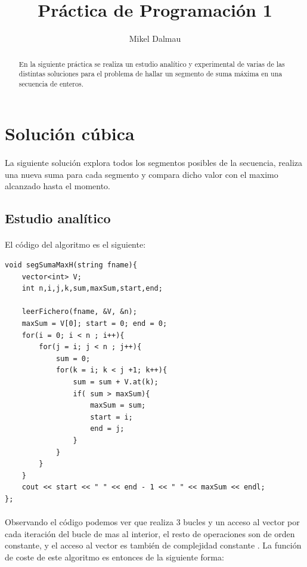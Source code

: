 \documentclass[es]{ifirak}
\begin{document}
\title{Práctica de Programación 1}
\author{Mikel Dalmau}

\maketitle

\begin{abstract}
En la siguiente práctica se realiza un estudio analítico y experimental de varias de las distintas soluciones para el problema de hallar un segmento de suma máxima en una secuencia de enteros.
\end{abstract}

\section{Solución cúbica}
\paragraph{}
La siguiente solución explora todos los segmentos posibles de la secuencia, realiza una nueva suma para cada segmento y compara dicho valor con el maximo alcanzado hasta el momento. 
\subsection{Estudio analítico}
\paragraph{}
El código del algoritmo es el siguiente:
\begin{lstlisting}
void segSumaMaxH(string fname){
	vector<int> V;
	int n,i,j,k,sum,maxSum,start,end;
	
	leerFichero(fname, &V, &n);
	maxSum = V[0]; start = 0; end = 0;
	for(i = 0; i < n ; i++){
		for(j = i; j < n ; j++){
			sum = 0;
			for(k = i; k < j +1; k++){
				sum = sum + V.at(k);
				if( sum > maxSum){
					maxSum = sum;
					start = i;
					end = j;
				}
			}
		}
	}
	cout << start << " " << end - 1 << " " << maxSum << endl; 
};
\end{lstlisting}
\paragraph{}
Observando el código podemos ver que realiza 3 bucles y un acceso al vector por cada iteración del bucle de mas al interior, el resto de operaciones son de orden constante, y el acceso al vector es también de complejidad constante \cite{key-1}. La función de coste de este algoritmo es entonces de la siguiente forma:
\end{document}
